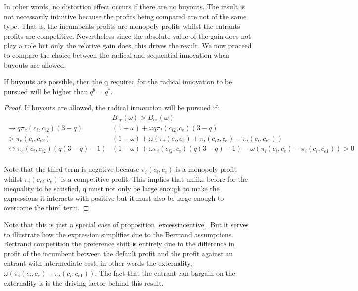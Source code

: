 In other words, no distortion effect occurs if there are no buyouts. The result is not necessarily intuitive because the profits being compared are not of the same type. That is, the incumbents profits are monopoly profits whilst the entrants profits are competitive. Nevertheless since the absolute value of the gain does not play a role but only the relative gain does, this drives the result.
We now proceed to compare the choice between the radical and sequential innovation when buyouts are allowed.

\begin{proposition}
\label{higherq}
If buyouts are possible, then the q required for the radical innovation to be pursued will be higher than $q^b=q^*$. 
\end{proposition}

\begin{proof}
If buyouts are allowed, the radical innovation will be pursued if:
\begin{align*}
&B_{er}(\omega)>B_{es}(\omega) \\
\rightarrow q \pi_{e}(c_{i},c_{e2})(3-q)&(1-\omega)
+ \omega q 
\pi_{i}(c_{i2},c_{e}) (3-q) \\
> \pi_{e}(c_{i},c_{e2})&(1-\omega)+ \omega (\pi_{i}(c_{i},c_{e}) +  \pi_{i}(c_{i2},c_{e}) - \pi_{i}(c_{i},c_{e1}) ) \\
\leftrightarrow \pi_{e}(c_{i},c_{e2})(q(3-q)-1)&(1-\omega)
+ \omega \pi_{i}(c_{i2},c_{e}) (q(3-q)-1)-\omega(\pi_{i}(c_{i},c_{e})- \pi_{i}(c_{i},c_{e1})) 
> 0 \\
\end{align*}

Note that the third term is negative because $\pi_{i}(c_{i},c_{e})$ is a monopoly profit whilst  $\pi_{i}(c_{i2},c_{e})$ is a competitive profit. This implies that unlike before for the inequality to be satisfied, q must not only be large enough to make the expressions it interacts with positive but it must also be large enough to overcome the third term.
\end{proof}

Note that this is just a special case of proposition \ref{excessincentive}. But it serves to illustrate how the expression simplifies due to the Bertrand assumptions. Bertrand competition the preference shift is entirely due to the difference in profit of the incumbent between the default profit and the profit against an entrant with intermediate cost, in other words the externality,   $\omega(\pi_i(c_i,c_e)- \pi_i(c_i,c_{e1})) $. The fact that the entrant can bargain on the externality is is the driving factor behind this result. 



